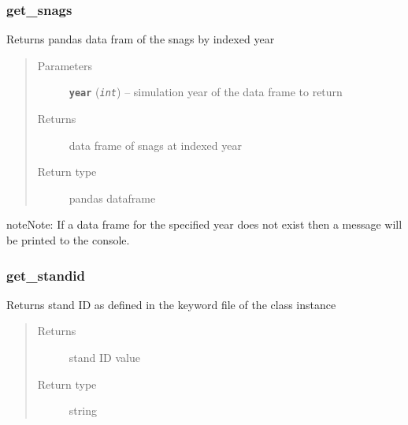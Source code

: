\documentclass[letterpaper,10pt,english]{sphinxmanual}
\begin{document}
\subsubsection{get\_snags}
\label{Fvsfuels:get-snags}

\begin{fulllineitems}
\label{Fvsfuels:fuels.Fvsfuels.get_snags}
Returns pandas data fram of the snags by indexed year
\begin{quote}\begin{description}
\item[{Parameters}] \leavevmode
\textbf{\texttt{year}} (\emph{\texttt{int}}) -- simulation year of the data frame to return

\item[{Returns}] \leavevmode
data frame of snags at indexed year

\item[{Return type}] \leavevmode
pandas dataframe

\end{description}\end{quote}

\begin{notice}{note}{Note:}
If a data frame for the specified year does not exist then
a message will be printed to the console.
\end{notice}

\end{fulllineitems}



\subsubsection{get\_standid}
\label{Fvsfuels:get-standid}

\begin{fulllineitems}
\label{Fvsfuels:fuels.Fvsfuels.get_standid}
Returns stand ID as defined in the keyword file of the class instance
\begin{quote}\begin{description}
\item[{Returns}] \leavevmode
stand ID value

\item[{Return type}] \leavevmode
string

\end{description}\end{quote}

\end{fulllineitems}
\end{document}
